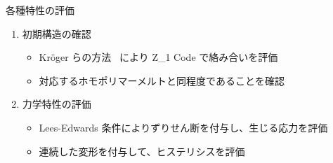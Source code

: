 \begin{columns}[totalwidth=.85\linewidth]
        \begin{itembox}[l]{各種特性の評価}
            \begin{enumerate}
                \item 初期構造の確認
                    \begin{itemize}
                        \normalsize
                        \item Kr\"{o}ger らの方法~\cite{kroger} により Z\_1 Code で絡み合いを評価
                        \item 対応するホモポリマーメルトと同程度であることを確認
                    \end{itemize}
                \item 力学特性の評価
                    \begin{itemize}
                        \normalsize
                        \item Lees-Edwards 条件によりずりせん断を付与し、生じる応力を評価
                        \item 連続した変形を付与して、ヒステリシスを評価
                    \end{itemize}	
            \end{enumerate}
        \end{itembox}
\end{columns}
